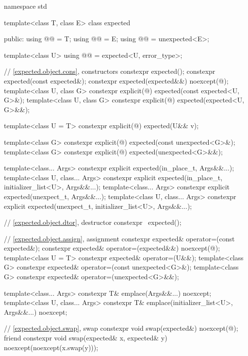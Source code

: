 \begin{codeblock}
namespace std {
  template<class T, class E>
  class expected {
  public:
    using @@ = T;
    using @@ = E;
    using @@ = unexpected<E>;

    template<class U>
    using @@ = expected<U, error_type>;

    // \ref{expected.object.cons}, constructors
    constexpr expected();
    constexpr expected(const expected&);
    constexpr expected(expected&&) noexcept(@\seebelow@);
    template<class U, class G>
      constexpr explicit(@\seebelow@) expected(const expected<U, G>&);
    template<class U, class G>
      constexpr explicit(@\seebelow@) expected(expected<U, G>&&);

    template<class U = T>
      constexpr explicit(@\seebelow@) expected(U&& v);

    template<class G>
      constexpr explicit(@\seebelow@) expected(const unexpected<G>&);
    template<class G>
      constexpr explicit(@\seebelow@) expected(unexpected<G>&&);

    template<class... Args>
      constexpr explicit expected(in_place_t, Args&&...);
    template<class U, class... Args>
      constexpr explicit expected(in_place_t, initializer_list<U>, Args&&...);
    template<class... Args>
      constexpr explicit expected(unexpect_t, Args&&...);
    template<class U, class... Args>
      constexpr explicit expected(unexpect_t, initializer_list<U>, Args&&...);

    // \ref{expected.object.dtor}, destructor
    constexpr ~expected();

    // \ref{expected.object.assign}, assignment
    constexpr expected& operator=(const expected&);
    constexpr expected& operator=(expected&&) noexcept(@\seebelow@);
    template<class U = T> constexpr expected& operator=(U&&);
    template<class G>
      constexpr expected& operator=(const unexpected<G>&);
    template<class G>
      constexpr expected& operator=(unexpected<G>&&);

    template<class... Args>
      constexpr T& emplace(Args&&...) noexcept;
    template<class U, class... Args>
      constexpr T& emplace(initializer_list<U>, Args&&...) noexcept;

    // \ref{expected.object.swap}, swap
    constexpr void swap(expected&) noexcept(@\seebelow@);
    friend constexpr void swap(expected& x, expected& y) noexcept(noexcept(x.swap(y)));

}}
\end{codeblock}
